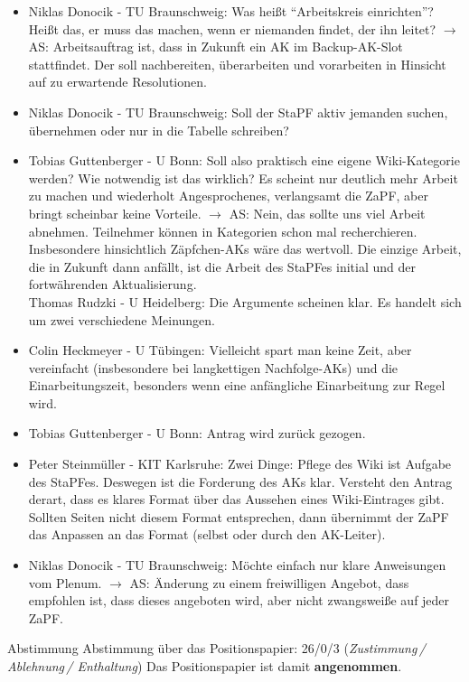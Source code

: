     \begin{itemize}
      \item Niklas Donocik - TU Braunschweig:  Was heißt ``Arbeitskreis einrichten''? Heißt das, er muss das machen, wenn er niemanden findet, der ihn leitet?
        $\rightarrow$ AS: Arbeitsauftrag ist, dass in Zukunft ein AK im Backup-AK-Slot stattfindet. Der soll nachbereiten, überarbeiten und vorarbeiten in Hinsicht auf zu erwartende Resolutionen.
      \item Niklas Donocik - TU Braunschweig:  Soll der StaPF aktiv jemanden suchen, übernehmen oder nur in die Tabelle schreiben?
      \item Tobias Guttenberger - U Bonn:  Soll also praktisch eine eigene Wiki-Kategorie werden? Wie notwendig ist das wirklich? Es scheint nur deutlich mehr Arbeit zu machen und wiederholt Angesprochenes, verlangsamt die ZaPF, aber bringt scheinbar keine Vorteile.
        $\rightarrow$ AS: Nein, das sollte uns viel Arbeit abnehmen. Teilnehmer können in Kategorien schon mal recherchieren.
      Insbesondere hinsichtlich Zäpfchen-AKs wäre das wertvoll. Die einzige Arbeit, die in Zukunft dann anfällt, ist die Arbeit des StaPFes initial und der fortwährenden Aktualisierung. \\
        Thomas Rudzki - U Heidelberg:  Die Argumente scheinen klar. Es handelt sich um zwei verschiedene Meinungen.
      \item Colin Heckmeyer - U Tübingen:  Vielleicht spart man keine Zeit, aber vereinfacht (insbesondere bei langkettigen Nachfolge-AKs) und  die Einarbeitungszeit, besonders wenn eine anfängliche Einarbeitung zur Regel wird.
      \item Tobias Guttenberger - U Bonn:  Antrag wird zurück gezogen.
      \item Peter Steinmüller - KIT Karlsruhe:  Zwei Dinge: Pflege des Wiki ist Aufgabe des StaPFes. Deswegen ist die Forderung des AKs klar.
      Versteht den Antrag derart, dass es klares Format über das Aussehen eines Wiki-Eintrages gibt. Sollten Seiten nicht diesem Format entsprechen, dann übernimmt der ZaPF das Anpassen an das Format (selbst oder durch den AK-Leiter).
      \item Niklas Donocik - TU Braunschweig:  Möchte einfach nur klare Anweisungen vom Plenum.
        $\rightarrow$ AS: Änderung zu einem freiwilligen Angebot, dass empfohlen ist, dass dieses angeboten wird, aber nicht zwangsweiße auf jeder ZaPF.
    \end{itemize}

    \begin{success}{Abstimmung}
      Abstimmung über das Positionspapier: 26/0/3 (\textit{Zustimmung\,/ Ablehnung\,/ Enthaltung})
      Das Positionspapier ist damit \textbf{angenommen}.
    \end{success}

